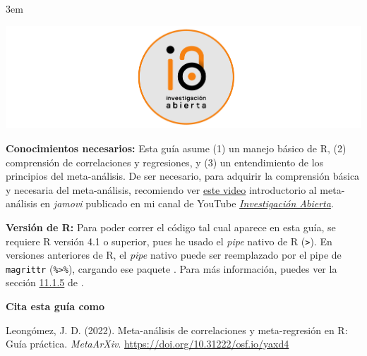 \documentclass[
  bookmarksnumbered]{article}
\begin{document}
\par
\endgroup

\par
\begingroup
\leftskip3em
\rightskip\leftskip
\footnotesize

\href{https://www.youtube.com/@InvestigacionAbierta}{\includegraphics[width=6.25in,height=\textheight]{images/Logo-IA-Rectangulo.pdf}}

\textbf{Conocimientos necesarios:} Esta guía asume (1) un manejo básico de R, (2) comprensión de correlaciones y regresiones, y (3) un entendimiento de los principios del meta-análisis. De ser necesario, para adquirir la comprensión básica y necesaria del meta-análisis, recomiendo ver \href{https://youtu.be/ntBbkOn9D_o}{este video} introductorio al meta-análisis en \emph{jamovi} \autocite{leongomezMetaanalysis2021} publicado en mi canal de YouTube \href{https://www.youtube.com/@InvestigacionAbierta}{\emph{Investigación Abierta}}.

\textbf{Versión de R:} Para poder correr el código tal cual aparece en esta guía, se requiere R versión 4.1 o superior, pues he usado el \emph{pipe} nativo de R (\texttt{\textbar{}\textgreater{}}). En versiones anteriores de R, el \emph{pipe} nativo puede ser reemplazado por el pipe de \texttt{magrittr} (\texttt{\%\textgreater{}\%}), cargando ese paquete \autocite{magrittrcite}. Para más información, puedes ver la sección \href{https://datanalytics.com/libro_r/1100_programacion.html\#tuber\%C3\%ADas-pipes}{11.1.5} de \textcite{gil2023}.

\par
\endgroup
\vfill

\textbf{Cita esta guía como } \hrulefill 

\begin{hangparas}{.25in}{1}
Leongómez, J. D. (2022). Meta-análisis de correlaciones y meta-regresión en R: Guía práctica. \textit{MetaArXiv}. \url{https://doi.org/10.31222/osf.io/yaxd4}
\end{hangparas}
\newpage

{\hypersetup{hidelinks}
 \setcounter{tocdepth}{5}
 \tableofcontents
}
\end{document}
